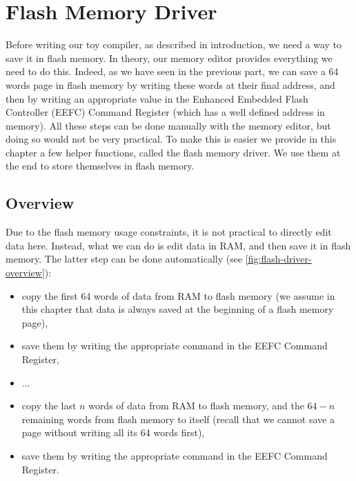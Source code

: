 
\renewcommand{\rustfile}{chapter1}
\setcounter{rustid}{0}


\chapter{Flash Memory Driver}\label{chapter:flash-driver}

Before writing our toy compiler, as described in introduction, we need a way to
save it in flash memory. In theory, our memory editor provides everything we
need to do this. Indeed, as we have seen in the previous part, we can save a 64
words page in flash memory by writing these words at their final address, and
then by writing an appropriate value in the Enhanced Embedded Flash Controller
(EEFC) Command Register (which has a well defined address in memory). All these
steps can be done manually with the memory editor, but doing so would not be
very practical. To make this is easier we provide in this chapter a few helper
functions, called the flash memory driver. We use them at the end to store
themselves in flash memory.

\section{Overview}

Due to the flash memory usage constraints, it is not practical to directly edit
data here. Instead, what we can do is edit data in RAM, and then save it in
flash memory. The latter step can be done automatically (see
\cref{fig:flash-driver-overview}):
\begin{itemize}
\item copy the first 64 words of data from RAM to flash memory (we assume in
this chapter that data is always saved at the beginning of a flash memory page),
\item save them by writing the appropriate command in the EEFC Command Register,
\item ...
\item copy the last $n$ words of data from RAM to flash memory, and the $64-n$
remaining words from flash memory to itself (recall that we cannot save a page
without writing all its 64 words first),
\item save them by writing the appropriate command in the EEFC Command Register.
\end{itemize}


